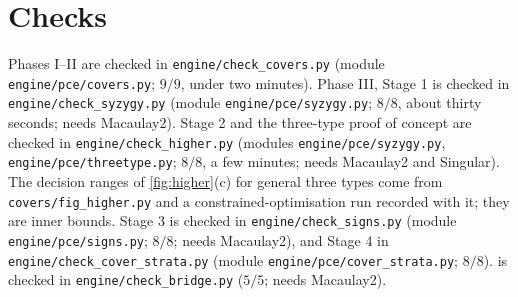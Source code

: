 \documentclass[11pt]{article}
\theoremstyle{definition}\newtheorem{definition}[theorem]{Definition}\newtheorem{remark}[theorem]{Remark}\newtheorem{example}[theorem]{Example}
\begin{document}
\section*{Checks}
Phases I--II are checked in \texttt{engine/check\_covers.py} (module \texttt{engine/pce/covers.py}; $9/9$, under two minutes).
Phase III, Stage 1 is checked in \texttt{engine/check\_syzygy.py} (module \texttt{engine/pce/syzygy.py}; $8/8$, about thirty seconds;
needs Macaulay2). Stage 2 and the three-type proof of concept are checked in \texttt{engine/check\_higher.py} (modules
\texttt{engine/pce/syzygy.py}, \texttt{engine/pce/threetype.py}; $8/8$, a few minutes; needs Macaulay2 and Singular). The decision
ranges of \cref{fig:higher}(c) for general three types come from \texttt{covers/fig\_higher.py} and a constrained-optimisation run
recorded with it; they are inner bounds. Stage 3 is checked in \texttt{engine/check\_signs.py} (module \texttt{engine/pce/signs.py};
$8/8$; needs Macaulay2), and Stage 4 in \texttt{engine/check\_cover\_strata.py} (module \texttt{engine/pce/cover\_strata.py}; $8/8$).  is checked in
\texttt{engine/check\_bridge.py} ($5/5$; needs Macaulay2).
\end{document}
